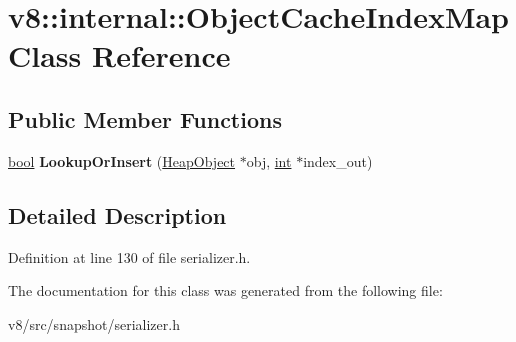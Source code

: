 \hypertarget{classv8_1_1internal_1_1ObjectCacheIndexMap}{}\section{v8\+:\+:internal\+:\+:Object\+Cache\+Index\+Map Class Reference}
\label{classv8_1_1internal_1_1ObjectCacheIndexMap}
\subsection*{Public Member Functions}
\begin{DoxyCompactItemize}
\item 
\mbox{\label{classv8_1_1internal_1_1ObjectCacheIndexMap_af19f2c521954023df279cb5a4e3605b6}} 
\mbox{\hyperlink{classbool}{bool}} {\bfseries Lookup\+Or\+Insert} (\mbox{\hyperlink{classv8_1_1internal_1_1HeapObject}{Heap\+Object}} $\ast$obj, \mbox{\hyperlink{classint}{int}} $\ast$index\+\_\+out)
\end{DoxyCompactItemize}


\subsection{Detailed Description}


Definition at line 130 of file serializer.\+h.



The documentation for this class was generated from the following file\+:\begin{DoxyCompactItemize}
\item 
v8/src/snapshot/serializer.\+h\end{DoxyCompactItemize}
